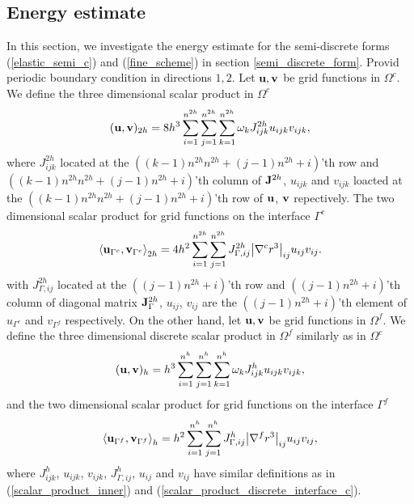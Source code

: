 \subsection{Energy estimate}


In this section, we investigate the energy estimate for the semi-discrete forms (\ref{elastic_semi_c}) and (\ref{fine_scheme}) in section \ref{semi_discrete_form}. Provid periodic boundary condition in directions $1, 2$. Let ${\bf u}, {\bf v}$ be grid functions in $\Omega^c$. We define the three dimensional scalar product in $\Omega^c$
\begin{equation}\label{scalar_product_inner}
({\bf u}, {\bf v})_{2h} = 8h^3\sum_{i=1}^{n^{2h}}\sum_{j=1}^{n^{2h}}\sum_{k=1}^{n^{2h}}\omega_k{J}_{ijk}^{2h}u_{ijk}v_{ijk},
\end{equation}
where $J^{2h}_{ijk}$ located at the $((k-1)n^{2h}n^{2h}+(j-1)n^{2h}+i)$'th row and $((k-1)n^{2h}n^{2h}+(j-1)n^{2h}+i)$'th column of ${\bf J}^{2h}$, $u_{ijk}$ and $v_{ijk}$ loacted at the $((k-1)n^{2h}n^{2h}+(j-1)n^{2h}+i)$'th row of ${\bf u}$, ${\bf v}$ repectively. The two dimensional scalar product for grid functions on the interface $\Gamma^c$
\begin{equation}\label{scalar_product_discrete_interface_c}
\left<{\bf u}_{\Gamma^c}, {\bf v}_{\Gamma^c}\right>_{2h} = 4h^2\sum_{i=1}^{n^{2h}}\sum_{j=1}^{n^{2h}}{ J}_{\Gamma,ij}^{2h}\big|\nabla^c r^{3}\big|_{ij}u_{ij}v_{ij}.
\end{equation}
with $J^{2h}_{\Gamma,ij}$ located at the $((j-1)n^{2h}+i)$'th row and $((j-1)n^{2h}+i)$'th column of diagonal matrix ${\bf J}_{\Gamma}^{2h}$, $u_{ij}$, $v_{ij}$ are the $((j-1)n^{2h}+i)$'th element of $u_{\Gamma^c}$ and $v_{\Gamma^f}$ respectively. On the other hand, let ${\bf u}, {\bf v}$ be grid functions in $\Omega^f$. We define the three dimensional discrete scalar product in $\Omega^f$ similarly as in $\Omega^c$
\begin{equation*}
({\bf u}, {\bf v})_{h} = h^3\sum_{i=1}^{n^{h}}\sum_{j=1}^{n^{h}}\sum_{k=1}^{n^{h}}\omega_k{J}_{ijk}^{h}u_{ijk}v_{ijk},
\end{equation*}
and the two dimensional scalar product for grid functions on the interface $\Gamma^f$
\begin{equation}\label{scalar_product_discrete_interface_f}
\left<{\bf u}_{\Gamma^f}, {\bf v}_{\Gamma^f}\right>_{h} = h^2\sum_{i=1}^{n^{h}}\sum_{j=1}^{n^{h}}{ J}^{h}_{\Gamma,ij}\big|\nabla^f r^{3}\big|_{ij}u_{ij}v_{ij},
\end{equation}
where $J^h_{ijk}$, $u_{ijk}$, $v_{ijk}$, $J^h_{\Gamma,ij}$, $u_{ij}$ and $v_{ij}$ have similar definitions as in (\ref{scalar_product_inner}) and (\ref{scalar_product_discrete_interface_c}).

